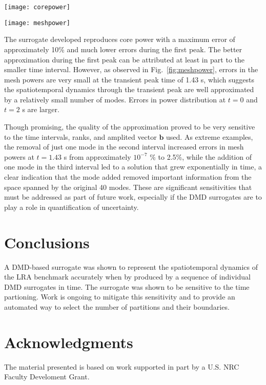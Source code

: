 \documentclass{anstrans}
\begin{document}
\begin{figure*}[t!]
 \centering
 \texttt{[image: corepower]}\\
   \caption{Left and center: reference and approximate core power density; right: corresponding absolute, relative error.}
  \label{fig:corepower}
\end{figure*}

\begin{figure*}[t!]
 \centering
 \texttt{[image: meshpower]}\\
   \caption{Left and center: reference and approximate mesh-wise powers (W); right: corresponding absolute, relative error.}
  \label{fig:meshpower}
\end{figure*}

The surrogate developed reproduces core power with a maximum error of approximately 10\% and much lower errors during the first peak.  The better approximation during the first peak can be attributed at least in part to the smaller time interval.  However, as observed in Fig.~\ref{fig:meshpower}, errors in the mesh powers are very small at the transient peak time of 1.43 s, which suggests the spatiotemporal dynamics through the transient peak are well approximated by a relatively small number of modes.  Errors in power distribution at $t = 0$ and $t = 2$ s are larger.


Though promising, the quality of the approximation proved to be very sensitive to the time intervals, ranks, and amplited vector $\mathbf{b}$ used.  As extreme examples, the removal of just one mode in the second interval increased errors in mesh powers at $t = 1.43$ s from approximately $10^{-7}$ \% to 2.5\%, while the addition of one mode in the third interval led to a solution that grew exponentially in time, a clear indication that the mode added removed important information from the space spanned by the original 40 modes.  These are  significant sensitivities that must be addressed as part of future work, especially if the DMD surrogates are to play a role in quantification of uncertainty.


\section{Conclusions}

A DMD-based surrogate was shown to represent the spatiotemporal dynamics of the LRA benchmark accurately when by produced by a sequence of individual DMD surrogates in time. 
The surrogate was shown to be sensitive to the time partioning.
Work is ongoing to mitigate this sensitivity and to provide an automated way to select the number of partitions and their boundaries.

\section{Acknowledgments}

The material presented is based on work supported in part by a U.S. NRC Faculty Develoment Grant. 



\end{document}
